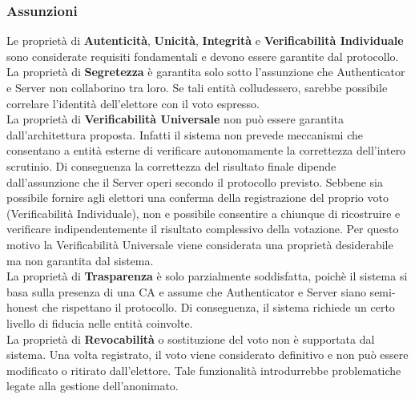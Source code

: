 \subsubsection{Assunzioni}
Le proprietà di \textbf{Autenticità}, \textbf{Unicità}, \textbf{Integrità} e \textbf{Verificabilità Individuale} sono considerate requisiti fondamentali e devono essere garantite dal protocollo. \\
La proprietà di \textbf{Segretezza} è garantita solo sotto l'assunzione che Authenticator e Server non collaborino tra loro. Se tali entità colludessero, sarebbe possibile correlare l'identità dell'elettore con il voto espresso. \\
La proprietà di \textbf{Verificabilità Universale} non può essere garantita dall'architettura proposta. Infatti il sistema non prevede meccanismi che consentano a entità esterne di verificare autonomamente la correttezza dell'intero scrutinio. Di conseguenza la correttezza del risultato finale dipende dall'assunzione che il Server operi secondo il protocollo previsto. Sebbene sia possibile fornire agli elettori una conferma della registrazione del proprio voto (Verificabilità Individuale), non e possibile consentire a chiunque di ricostruire e verificare indipendentemente il risultato complessivo della votazione. Per questo motivo la Verificabilità Universale viene considerata una proprietà desiderabile ma non garantita dal sistema. \\
La proprietà di \textbf{Trasparenza} è solo parzialmente soddisfatta, poichè il sistema si basa sulla presenza di una CA e assume che Authenticator e Server siano semi-honest che rispettano il protocollo. Di conseguenza, il sistema richiede un certo livello di fiducia nelle entità coinvolte. \\
La proprietà di \textbf{Revocabilità} o sostituzione del voto non è supportata dal sistema. Una volta registrato, il voto viene considerato definitivo e non può essere modificato o ritirato dall'elettore. Tale funzionalità introdurrebbe problematiche legate alla gestione dell'anonimato.

\divider


	
	